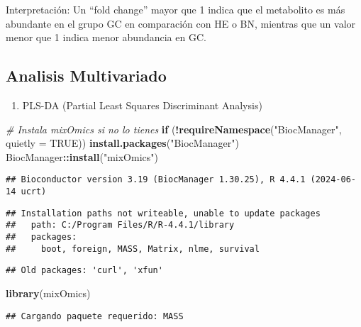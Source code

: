 \documentclass[
]{article}
\newenvironment{Shaded}{\begin{snugshade}}{\end{snugshade}}
\newcommand{\AttributeTok}[1]{\textcolor[rgb]{0.13,0.29,0.53}{#1}}
\newcommand{\CommentTok}[1]{\textcolor[rgb]{0.56,0.35,0.01}{\textit{#1}}}
\newcommand{\ConstantTok}[1]{\textcolor[rgb]{0.56,0.35,0.01}{#1}}
\newcommand{\ControlFlowTok}[1]{\textcolor[rgb]{0.13,0.29,0.53}{\textbf{#1}}}
\newcommand{\FunctionTok}[1]{\textcolor[rgb]{0.13,0.29,0.53}{\textbf{#1}}}
\newcommand{\NormalTok}[1]{#1}
\newcommand{\SpecialCharTok}[1]{\textcolor[rgb]{0.81,0.36,0.00}{\textbf{#1}}}
\newcommand{\StringTok}[1]{\textcolor[rgb]{0.31,0.60,0.02}{#1}}
\providecommand{\tightlist}{%
  \setlength{\itemsep}{0pt}\setlength{\parskip}{0pt}}
\begin{document}
Interpretación: Un ``fold change'' mayor que 1 indica que el metabolito
es más abundante en el grupo GC en comparación con HE o BN, mientras que
un valor menor que 1 indica menor abundancia en GC.

\subsection{Analisis Multivariado}\label{analisis-multivariado}

\begin{enumerate}
\def\labelenumi{\arabic{enumi}.}
\tightlist
\item
  PLS-DA (Partial Least Squares Discriminant Analysis)
\end{enumerate}

\begin{Shaded}
\begin{Highlighting}[]
\CommentTok{\# Instala mixOmics si no lo tienes}
\ControlFlowTok{if}\NormalTok{ (}\SpecialCharTok{!}\FunctionTok{requireNamespace}\NormalTok{(}\StringTok{"BiocManager"}\NormalTok{, }\AttributeTok{quietly =} \ConstantTok{TRUE}\NormalTok{))}
    \FunctionTok{install.packages}\NormalTok{(}\StringTok{"BiocManager"}\NormalTok{)}
\NormalTok{BiocManager}\SpecialCharTok{::}\FunctionTok{install}\NormalTok{(}\StringTok{"mixOmics"}\NormalTok{)}
\end{Highlighting}
\end{Shaded}

\begin{verbatim}
## Bioconductor version 3.19 (BiocManager 1.30.25), R 4.4.1 (2024-06-14 ucrt)
\end{verbatim}

\begin{verbatim}
## Installation paths not writeable, unable to update packages
##   path: C:/Program Files/R/R-4.4.1/library
##   packages:
##     boot, foreign, MASS, Matrix, nlme, survival
\end{verbatim}

\begin{verbatim}
## Old packages: 'curl', 'xfun'
\end{verbatim}

\begin{Shaded}
\begin{Highlighting}[]
\FunctionTok{library}\NormalTok{(mixOmics)}
\end{Highlighting}
\end{Shaded}

\begin{verbatim}
## Cargando paquete requerido: MASS
\end{verbatim}
\end{document}
